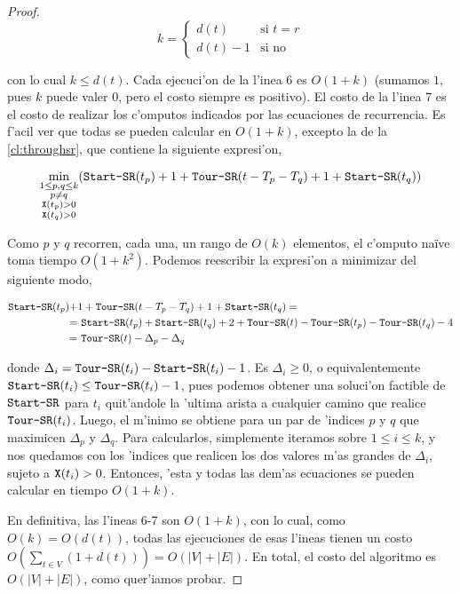 \begin{theorem}
\begin{proof}
\[k = \left\{
	\begin{array}{ll}
		d(t) & \mbox{si } t = r\\
		d(t) - 1 & \mbox{si no}
	\end{array}
\right.\]

\noindent
con lo cual $k \leq d(t)$. Cada ejecuci'on de la l'inea 6 es $O(1 + k)$ (sumamos $1$, pues $k$ puede valer $0$, pero el costo siempre es positivo). El costo de la l'inea 7 es el costo de realizar los c'omputos indicados por las ecuaciones de recurrencia. Es f'acil ver que todas se pueden calcular en $O(1 + k)$, excepto la de la \autoref{cl:throughsr}, que contiene la siguiente expresi'on,

\[\min\limits_{\substack{1 \leq p, q \leq k \\ p \neq q \\ \texttt{X}(t_p) > 0 \\ \texttt{X}(t_q) > 0}} (\texttt{Start-SR}(t_p) + 1 + \texttt{Tour-SR}(t - T_p - T_q) + 1 + \texttt{Start-SR}(t_q))\]

\noindent
Como $p$ y $q$ recorren, cada una, un rango de $O(k)$ elementos, el c'omputo na\"ive toma tiempo $O(1 + k^2)$. Podemos reescribir la expresi'on a minimizar del siguiente modo,

\begin{align*}
\texttt{Start-SR}(t_p) + &1 + \texttt{Tour-SR}(t - T_p - T_q) + 1 + \texttt{Start-SR}(t_q) =\\
=& \text{ }\texttt{Start-SR}(t_p) + \texttt{Start-SR}(t_q) + 2 + \texttt{Tour-SR}(t) - \texttt{Tour-SR}(t_p) - \texttt{Tour-SR}(t_q) - 4\\
=& \text{ }\texttt{Tour-SR}(t) - \Delta_p - \Delta_q
\end{align*}

\noindent
donde $\Delta_i = \texttt{Tour-SR}(t_i) - \texttt{Start-SR}(t_i) - 1$. Es $\Delta_i \geq 0$, o equivalentemente $\texttt{Start-SR}(t_i) \leq \texttt{Tour-SR}(t_i) - 1$, pues podemos obtener una soluci'on factible de $\texttt{Start-SR}$ para $t_i$ quit'andole la 'ultima arista a cualquier camino que realice $\texttt{Tour-SR}(t_i)$. Luego, el m'inimo se obtiene para un par de 'indices $p$ y $q$ que maximicen $\Delta_p$ y $\Delta_q$. Para calcularlos, simplemente iteramos sobre $1 \leq i \leq k$, y nos quedamos con los 'indices que realicen los dos valores m'as grandes de $\Delta_i$, sujeto a $\texttt{X}(t_i) > 0$. Entonces, 'esta y todas las dem'as ecuaciones se pueden calcular en tiempo $O(1 + k)$.

En definitiva, las l'ineas 6-7 son $O(1 + k)$, con lo cual, como $O(k) = O(d(t))$, todas las ejecuciones de esas l'ineas tienen un costo $O(\sum_{t \in V} (1 + d(t))) = O(|V| + |E|)$. En total, el costo del algoritmo es $O(|V| + |E|)$, como quer'iamos probar.
\end{proof}
\end{theorem}

